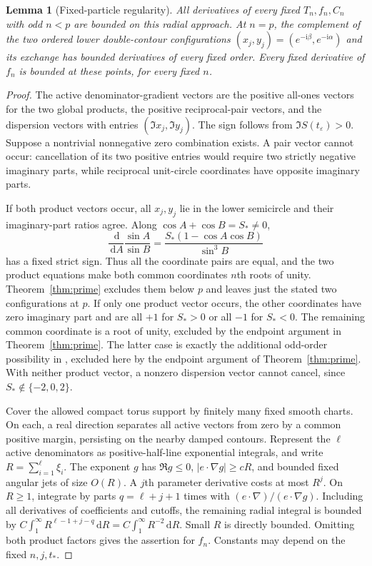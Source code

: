 \documentclass[11pt]{article}
\numberwithin{equation}{section}
\newtheorem{lemma}[theorem]{Lemma}
\theoremstyle{definition}
\newcommand{\dd}{\,\mathrm d}
\newcommand{\ii}{\mathrm i}
\newcommand{\eps}{\varepsilon}
\begin{document}
\begin{lemma}[Fixed-particle regularity]\label{lem:complement}
All derivatives of every fixed $T_n,f_n,C_n$ with odd $n<p$
are bounded on this radial approach. At $n=p$, the complement
of the two ordered lower double-contour configurations
$(x_j,y_j)=(e^{-\ii\beta},e^{-\ii\alpha})$ and its exchange
has bounded derivatives of every fixed order. Every fixed
derivative of $f_n$ is bounded at these points, for every fixed $n$.
\end{lemma}
\begin{proof}
The active denominator-gradient vectors are the positive all-ones
vectors for the two global products, the positive reciprocal-pair
vectors, and the dispersion vectors with entries
$(\Im x_j,\Im y_j)$. The sign follows from $\Im S(t_\eps)>0$.
Suppose a nontrivial nonnegative zero combination exists. A pair
vector cannot occur: cancellation of its two positive entries would
require two strictly negative imaginary parts, while reciprocal
unit-circle coordinates have opposite imaginary parts.

If both product vectors occur, all $x_j,y_j$ lie in the lower
semicircle and their imaginary-part ratios agree. Along
$\cos A+\cos B=S_*\ne0$,
\[
 \frac{\dd}{\dd A}\frac{\sin A}{\sin B}
 =\frac{S_*(1-\cos A\cos B)}{\sin^3 B}
\]
has a fixed strict sign. Thus all the coordinate pairs are equal,
and the two product equations make both common coordinates $n$th
roots of unity. Theorem~\ref{thm:prime} excludes them below $p$
and leaves just the stated two configurations at $p$.
If only one product vector occurs, the other coordinates have zero
imaginary part and are all $+1$ for $S_*>0$ or all $-1$ for
$S_*<0$. The remaining common coordinate is a root of unity,
excluded by the endpoint argument in Theorem~\ref{thm:prime}.
The latter case is exactly the additional odd-order possibility
in \cite[footnote~5]{TW2014}, excluded here by the endpoint argument
of Theorem~\ref{thm:prime}. With neither product vector, a nonzero dispersion
vector cannot cancel, since $S_*\notin\{-2,0,2\}$.

Cover the allowed compact torus support by finitely many fixed
smooth charts. On each, a real direction separates all active
vectors from zero by a common positive margin, persisting on the
nearby damped contours. Represent the $\ell$ active denominators
as positive-half-line exponential integrals, and write
$R=\sum_{i=1}^{\ell}\xi_i$. The exponent $g$ has
$\Re g\le0$, $|e\cdot\nabla g|\ge cR$, and bounded fixed
angular jets of size $O(R)$. A $j$th parameter derivative costs
at most $R^j$. On $R\ge1$, integrate by parts
$q=\ell+j+1$ times with $(e\cdot\nabla)/(e\cdot\nabla g)$.
Including all derivatives of coefficients and cutoffs, the
remaining radial integral is bounded by
$C\int_1^\infty R^{\ell-1+j-q}\dd R=C\int_1^\infty R^{-2}\dd R$.
Small $R$ is directly bounded. Omitting both product factors gives
the assertion for $f_n$. Constants may depend on the fixed $n,j,t_*$.
\end{proof}
\end{document}
